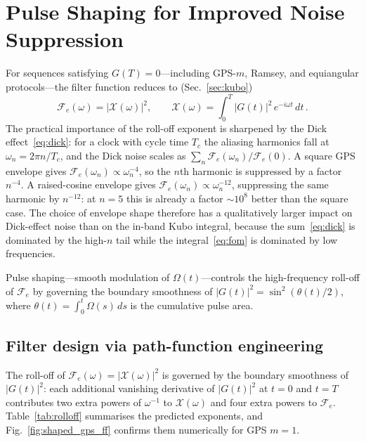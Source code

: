 \documentclass[aps,pra,twocolumn,superscriptaddress,longbibliography]{revtex4-2}
\newcommand{\be}{\begin{equation}}
\newcommand{\ee}{\end{equation}}
\newcommand{\LZ}[1]{{\color{green}\textbf{[LZ: #1]}}}
\begin{document}
\section{Pulse Shaping for Improved Noise Suppression}
\label{sec:pulseshaping}

For sequences satisfying $G(T)=0$---including GPS-$m$, Ramsey, and equiangular
protocols---the filter function reduces to (Sec.~\ref{sec:kubo})
\be
  \mathcal{F}_e(\omega) = |\mathcal{X}(\omega)|^2, \qquad
  \mathcal{X}(\omega) = \int_0^T |G(t)|^2\,e^{-i\omega t}\,dt\,.
  \label{eq:Fe_GPS}
\ee
The practical importance of the roll-off exponent is sharpened by the Dick
effect~\eqref{eq:dick}: for a clock with cycle time $T_c$ the aliasing harmonics fall at
$\omega_n = 2\pi n/T_c$, and the Dick noise scales as $\sum_n\mathcal{F}_e(\omega_n)/\mathcal{F}_e(0)$.
A square GPS envelope gives $\mathcal{F}_e(\omega_n)\propto\omega_n^{-4}$, so the
$n$th harmonic is suppressed by a factor $n^{-4}$.
A raised-cosine envelope gives $\mathcal{F}_e(\omega_n)\propto\omega_n^{-12}$, suppressing
the same harmonic by $n^{-12}$: at $n=5$ this is already a factor $\sim 10^8$ better than
the square case.
The choice of envelope shape therefore has a qualitatively larger impact on Dick-effect
noise than on the in-band Kubo integral, because the sum~\eqref{eq:dick} is dominated
by the high-$n$ tail while the integral~\eqref{eq:fom} is dominated by low frequencies.

Pulse shaping---smooth modulation of $\Omega(t)$---controls the high-frequency roll-off
of $\mathcal{F}_e$ by governing the boundary smoothness of $|G(t)|^2 = \sin^2(\theta(t)/2)$,
where $\theta(t)=\int_0^t\Omega(s)\,ds$ is the cumulative pulse area.

\subsection{Filter design via path-function engineering}

The roll-off of $\mathcal{F}_e(\omega) = |\mathcal{X}(\omega)|^2$
is governed by the boundary smoothness of $|G(t)|^2$: each additional vanishing derivative
of $|G(t)|^2$ at $t=0$ and $t=T$ contributes two extra powers of $\omega^{-1}$ to
$\mathcal{X}(\omega)$ and four extra powers to $\mathcal{F}_e$.
Table~\ref{tab:rolloff} summarises the predicted exponents, and
Fig.~\ref{fig:shaped_gps_ff} confirms them numerically for GPS $m{=}1$.
\end{document}

